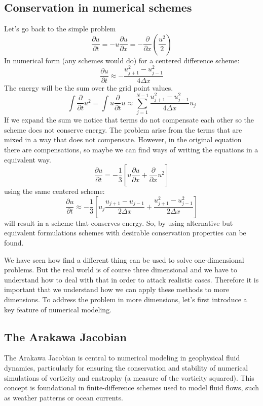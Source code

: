 \subsection{Conservation in numerical schemes}
Let's go back to the simple problem 
\begin{equation}
    \frac{\partial u}{\partial t}=-u\frac{\partial u}{\partial x}=-\frac{\partial}{\partial x}\left(\frac{u^2}{2}\right)
\end{equation}
In numerical form (any schemes would do) for a centered difference scheme:
\begin{equation}
    \frac{\partial u}{\partial t}\approx -\frac{u^2_{j+1}-u^2_{j-1}}{4\Delta x}
\end{equation}
The energy will be the sum over the grid point values. 
\begin{equation}
    \int\frac{\partial}{\partial t}u^2=\int u\frac{\partial}{\partial t}u\approx\displaystyle\sum_{j=1}^{N-1}\frac{u^2_{j+1}-u^2_{j-1}}{4\Delta x}u_j
\end{equation}
If we expand the sum we notice that terms do not compensate each other so the scheme does not conserve energy. The problem arise from the terms that are mixed in a way that does not compensate. However, in the original equation there are compensations, so maybe we can find ways of writing the equations in a equivalent way. 
$$
    \frac{\partial u}{\partial t}=-\frac{1}{3}\left[u\frac{\partial u}{\partial x}+\frac{\partial}{\partial x}u^2\right]
$$
using the same centered scheme:
$$\frac{\partial u}{\partial t}\approx -\frac{1}{3}\left[u_j\frac{u_{j+1}-u_{j-1}}{2\Delta x}+\frac{u^2_{j+1}-u^2_{j-1}}{2\Delta x}\right]
$$
will result in a scheme that conserves energy. So, by using alternative but equivalent formulations schemes with desirable conservation properties can be found. 

We have seen how find a different thing can be used to solve one-dimensional problems. But the real world is of course three dimensional and we have to understand how to deal with that in order to attack realistic cases. Therefore it is important that we understand how we can apply these methods to more dimensions. To address the problem in more dimensions, let's first introduce a key feature of numerical modeling.
\subsection{The Arakawa Jacobian}
The Arakawa Jacobian is central to numerical modeling in geophysical fluid dynamics, particularly for ensuring the conservation and stability of numerical simulations of vorticity and enstrophy (a measure of the vorticity squared). This concept is foundational in finite-difference schemes used to model fluid flows, such as weather patterns or ocean currents.


